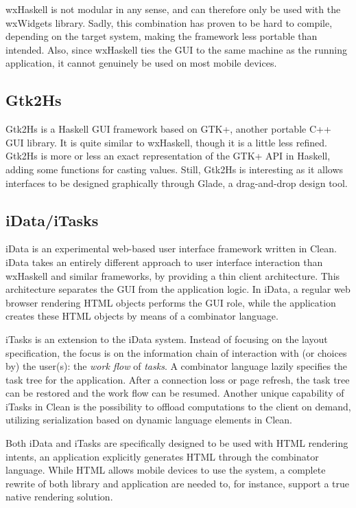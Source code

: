 \documentclass[11pt,a4paper]{article}
\begin{document}
wxHaskell is not modular in any sense, and can therefore only be used with the wxWidgets library.
Sadly, this combination has proven to be hard to compile, depending on the target system, making the framework less portable than intended.
Also, since wxHaskell ties the GUI to the same machine as the running application, it cannot genuinely be used on most mobile devices.

\subsection{Gtk2Hs}
Gtk2Hs is a Haskell GUI framework based on GTK+, another portable C++ GUI library.
It is quite similar to wxHaskell, though it is a little less refined.\cite{vanbuilding}
Gtk2Hs is more or less an exact representation of the GTK+ API in Haskell, adding some functions for casting values.
Still, Gtk2Hs is interesting as it allows interfaces to be designed graphically through Glade, a drag-and-drop design tool.

\subsection{iData/iTasks}
iData is an experimental web-based user interface framework written in Clean.
iData takes an entirely different approach to user interface interaction than wxHaskell and similar frameworks, by providing a thin client architecture.
This architecture separates the GUI from the application logic.
In iData, a regular web browser rendering HTML objects performs the GUI role, while the application creates these HTML objects by means of a combinator language.

iTasks is an extension to the iData system.
Instead of focusing on the layout specification, the focus is on the information chain of interaction with (or choices by) the user(s): the \textit{work flow} of \textit{tasks}.\cite{plasmeijer2007itasks}
A combinator language lazily specifies the task tree for the application.
After a connection loss or page refresh, the task tree can be restored and the work flow can be resumed.
Another unique capability of iTasks in Clean is the possibility to offload computations to the client on demand, utilizing serialization based on dynamic language elements in Clean.\cite{jansen2010embedding}

Both iData and iTasks are specifically designed to be used with HTML rendering intents, an application explicitly generates HTML through the combinator language.
While HTML allows mobile devices to use the system, a complete rewrite of both library and application are needed to, for instance, support a true native rendering solution.
\end{document}

